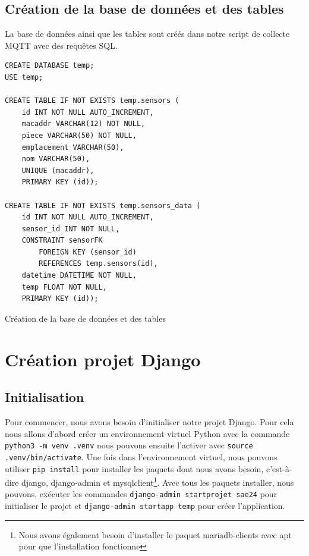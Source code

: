 \documentclass{article}
\begin{document}
\subsection{Création de la base de données et des tables}
La base de données ainsi que les tables sont créés dans notre script de collecte MQTT avec des requêtes SQL.
\begin{listing}[H]
    \begin{verbatim}
CREATE DATABASE temp;
USE temp;

CREATE TABLE IF NOT EXISTS temp.sensors (
    id INT NOT NULL AUTO_INCREMENT,
    macaddr VARCHAR(12) NOT NULL,
    piece VARCHAR(50) NOT NULL,
    emplacement VARCHAR(50),
    nom VARCHAR(50),
    UNIQUE (macaddr),
    PRIMARY KEY (id));

CREATE TABLE IF NOT EXISTS temp.sensors_data (
    id INT NOT NULL AUTO_INCREMENT,
    sensor_id INT NOT NULL,
    CONSTRAINT sensorFK
        FOREIGN KEY (sensor_id)
        REFERENCES temp.sensors(id),
    datetime DATETIME NOT NULL,
    temp FLOAT NOT NULL,
    PRIMARY KEY (id));
    \end{verbatim}
    \caption{Création de la base de données et des tables}
    \label{bdd:creation}
\end{listing}

\section{Création projet Django}
\subsection{Initialisation}
Pour commencer, nous avons besoin d'initialiser notre projet Django.
Pour cela nous allons d'abord créer un environnement virtuel Python avec la commande \verb|python3 -m venv .venv| nous pouvons ensuite l'activer avec \verb|source .venv/bin/activate|.
Une fois dans l'environnement virtuel, nous pouvons utiliser \verb|pip install| pour installer les paquets dont nous avons besoin, c'est-à-dire django, django-admin et mysqlclient\footnote{Nous avons également besoin d'installer le paquet mariadb-clients avec apt pour que l'installation fonctionne}.
Avec tous les paquets installer, nous pouvons, exécuter les commandes \verb|django-admin startprojet sae24| pour initialiser le projet et \verb|django-admin startapp temp| pour créer l'application.
\end{document}
